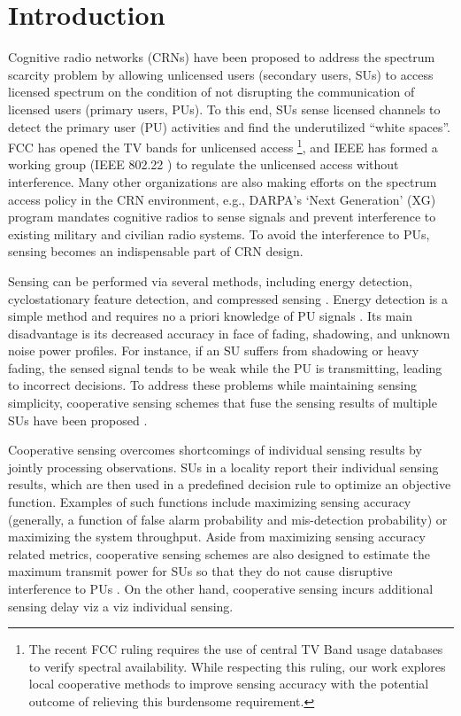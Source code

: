 \documentclass[conference]{IEEEtran}
\begin{document}
\section{Introduction}
\label{sec:intro}
Cognitive radio networks (CRNs) have been proposed to address the
spectrum scarcity problem by allowing unlicensed users (secondary users, SUs) to access licensed spectrum on the condition of not disrupting the
communication of licensed users (primary users, PUs).
To this end, SUs sense licensed channels to detect the primary user
(PU) activities and find the underutilized ``white spaces''. 
FCC has opened the TV bands for unlicensed access \cite{FCC}\footnote{The recent
FCC ruling requires the use of central TV Band usage databases to verify 
spectral availability. While respecting this ruling, our work explores local
cooperative methods to improve sensing accuracy with the potential outcome of
relieving this burdensome requirement.}, and IEEE has formed a
working group (IEEE 802.22 \cite{ieee}) to regulate the unlicensed access without interference. Many other organizations are also making efforts on the spectrum access policy in the CRN environment, e.g., DARPA's `Next Generation' (XG) program \cite{4221472} mandates cognitive radios to sense signals and prevent interference to existing military and civilian radio systems. To avoid the interference to PUs, sensing becomes
an indispensable part of CRN design.

Sensing can be performed via several methods, including
energy detection, cyclostationary feature detection, and compressed sensing \cite{survey}. Energy detection is a simple method 
and requires no a priori knowledge of PU signals \cite{1447503}. Its main disadvantage is its decreased accuracy in face of fading, 
shadowing, and unknown noise power profiles. For instance, if an SU 
suffers from shadowing or heavy fading, the sensed signal tends to be 
weak while the PU is transmitting, leading to incorrect decisions. 
To address these problems while maintaining sensing simplicity, 
cooperative sensing schemes that fuse the sensing results of multiple SUs 
have been proposed \cite{Ganesan05}\cite{Mishra06}\cite{5169958}.  

Cooperative sensing overcomes shortcomings of individual sensing results 
by jointly processing observations. SUs in a locality report their 
individual sensing results, which are then used in a predefined
decision rule to optimize an objective function.
Examples of such functions include maximizing sensing accuracy (generally,
a function of false alarm probability and mis-detection probability) or
maximizing the system throughput. Aside from maximizing sensing accuracy related metrics, cooperative sensing schemes are also designed to estimate the maximum transmit power for SUs so that they do not cause disruptive interference to PUs \cite{4927466}. On the other hand, cooperative sensing 
incurs additional sensing delay viz a viz individual sensing.
\end{document}
